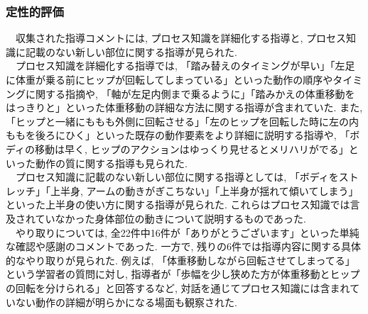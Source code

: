 \subsubsection{定性的評価}
　収集された指導コメントには, プロセス知識を詳細化する指導と, プロセス知識に記載のない新しい部位に関する指導が見られた.\\
　プロセス知識を詳細化する指導では, 「踏み替えのタイミングが早い」「左足に体重が乗る前にヒップが回転してしまっている」といった動作の順序やタイミングに関する指摘や, 「軸が左足内側まで乗るように」「踏みかえの体重移動をはっきりと」といった体重移動の詳細な方法に関する指導が含まれていた. また,「ヒップと一緒にももも外側に回転させる」「左のヒップを回転した時に左の内ももを後ろにひく」といった既存の動作要素をより詳細に説明する指導や, 「ボディの移動は早く, ヒップのアクションはゆっくり見せるとメリハリがでる」といった動作の質に関する指導も見られた.\\
　プロセス知識に記載のない新しい部位に関する指導としては, 「ボディをストレッチ」「上半身, アームの動きがぎこちない」「上半身が揺れて傾いてしまう」といった上半身の使い方に関する指導が見られた. これらはプロセス知識では言及されていなかった身体部位の動きについて説明するものであった.\\
　やり取りについては, 全22件中16件が「ありがとうございます」といった単純な確認や感謝のコメントであった. 一方で, 残りの6件では指導内容に関する具体的なやり取りが見られた. 例えば, 「体重移動しながら回転させてしまってる」という学習者の質問に対し, 指導者が「歩幅を少し狭めた方が体重移動とヒップの回転を分けられる」と回答するなど, 対話を通じてプロセス知識には含まれていない動作の詳細が明らかになる場面も観察された.\\

